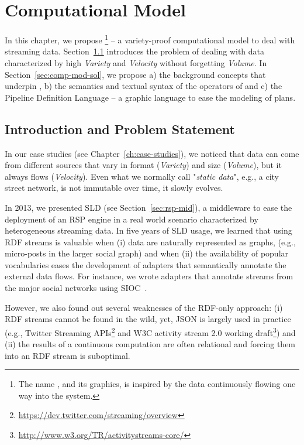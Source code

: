 \chapter{Computational Model}\label{ch:computational}

In this chapter, we propose \river{}\footnote{The name \river, and its graphics, is inspired by the data continuously flowing one way into the system.} -- a variety-proof computational model to deal with streaming data.
Section~\ref{sec:comp-mod-intro} introduces the problem of dealing with data characterized by high \textit{Variety} and \textit{Velocity} without forgetting \textit{Volume}.
In Section~\ref{sec:comp-mod-sol}, we propose a) the background concepts that underpin \river{}, b) the semantics and textual syntax of the operators of \river{} and c) the Pipeline Definition Language -- a graphic language to ease the modeling of \river{} plans.

\section{Introduction and Problem Statement} \label{sec:comp-mod-intro}
In our case studies (see Chapter~\ref{ch:case-studies}), we noticed that data can come from different sources that vary in format (\textit{Variety}) and size (\textit{Volume}), but it  always flows (\textit{Velocity}). Even what we normally call "\textit{static data}", e.g.,  a city street network, is not immutable over time, it  slowly evolves.

In 2013, we presented SLD (see Section~\ref{sec:rsp-mid}), a middleware to ease the deployment of an RSP engine in a real world scenario characterized by heterogeneous streaming data.
In five years of SLD usage, we learned that using RDF streams is valuable when (i) data are naturally represented as graphs, (e.g., micro-posts in the larger social graph) and when (ii) the availability of popular vocabularies eases the development of adapters that semantically annotate the external data flows.
For instance, we wrote adapters that annotate streams from the major social networks using SIOC~\cite{DBLP:journals/ijwbc/BreslinDHB06}.

However, we also found out several weaknesses of the RDF-only approach: (i) RDF streams cannot be found in the wild, yet, JSON is largely used in practice (e.g., Twitter Streaming APIs\footnote{\url{https://dev.twitter.com/streaming/overview}} and W3C activity stream 2.0 working draft\footnote{\url{http://www.w3.org/TR/activitystreams-core/}}) and (ii) the results of a continuous computation are often relational and forcing them into an RDF stream is suboptimal.

